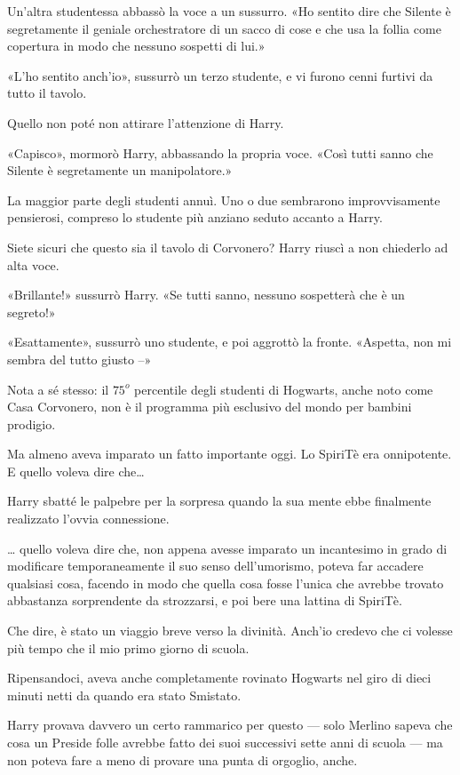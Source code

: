 Un’altra studentessa abbassò la voce a un sussurro. «Ho sentito dire che Silente è segretamente il geniale orchestratore di un sacco di cose e che usa la follia come copertura in modo che nessuno sospetti di lui.»

«L’ho sentito anch’io», sussurrò un terzo studente, e vi furono cenni furtivi da tutto il tavolo.

Quello non poté non attirare l’attenzione di Harry.

«Capisco», mormorò Harry, abbassando la propria voce. «Così tutti sanno che Silente è segretamente un manipolatore.»

La maggior parte degli studenti annuì. Uno o due sembrarono improvvisamente pensierosi, compreso lo studente più anziano seduto accanto a Harry.

Siete sicuri che questo sia il tavolo di Corvonero? Harry riuscì a non chiederlo ad alta voce.

«Brillante!» sussurrò Harry. «Se tutti sanno, nessuno sospetterà che è un segreto!»

«Esattamente», sussurrò uno studente, e poi aggrottò la fronte. «Aspetta, non mi sembra del tutto giusto –»

Nota a sé stesso: il $75^o$ percentile degli studenti di Hogwarts, anche noto come Casa Corvonero, non è il programma più esclusivo del mondo per bambini prodigio.

Ma almeno aveva imparato un fatto importante oggi. Lo SpiriTè era onnipotente. E quello voleva dire che…

Harry sbatté le palpebre per la sorpresa quando la sua mente ebbe finalmente realizzato l’ovvia connessione.

… quello voleva dire che, non appena avesse imparato un incantesimo in grado di modificare temporaneamente il suo senso dell’umorismo, poteva far accadere qualsiasi cosa, facendo in modo che quella cosa fosse l’unica che avrebbe trovato abbastanza sorprendente da strozzarsi, e poi bere una lattina di SpiriTè.

Che dire, è stato un viaggio breve verso la divinità. Anch’io credevo che ci volesse più tempo che il mio primo giorno di scuola.

Ripensandoci, aveva anche completamente rovinato Hogwarts nel giro di dieci minuti netti da quando era stato Smistato.

Harry provava davvero un certo rammarico per questo — solo Merlino sapeva che cosa un Preside folle avrebbe fatto dei suoi successivi sette anni di scuola — ma non poteva fare a meno di provare una punta di orgoglio, anche.


